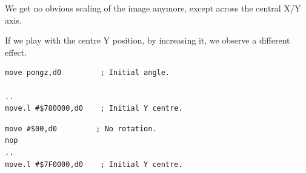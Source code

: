 We get no obvious scaling of the image anymore, except across the central X/Y axis.

If we play with the centre Y position, by increasing it, we observe a different effect.

\begin{minipage}[c]{0.48\linewidth}
\begin{lstlisting}[basicstyle=\scriptsize\ttfamily]
move pongz,d0         ; Initial angle.

..
move.l #$780000,d0    ; Initial Y centre.
\end{lstlisting}
\end{minipage}
\hspace{0.1cm}
\hspace{0.1cm}
\begin{minipage}[c]{0.48\linewidth}
\begin{lstlisting}[basicstyle=\scriptsize\ttfamily]
move #$00,d0         ; No rotation.
nop
..
move.l #$7F0000,d0    ; Initial Y centre.
\end{lstlisting}
\vspace*{\fill}
\end{minipage}

